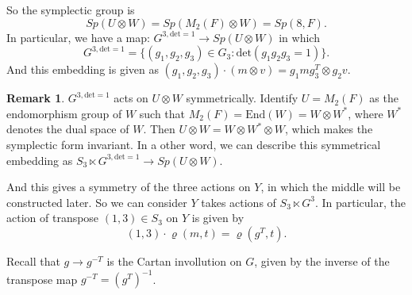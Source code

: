 \documentclass[12pt,a4paper,english]{article}
\theoremstyle{plain}
\theoremstyle{definition}
\newtheorem*{rem}{Remark}
\begin{document}
So the symplectic group is 
\begin{equation*}
    Sp(U\otimes W)=Sp(M_{2}(F)\otimes W)=Sp(8, F).
\end{equation*}
In particular, we have a map:
    $G^{3, \text{det}=1}\rightarrow Sp(U\otimes W)$
in which $$G^{3,\text{det}=1}=\{(g_{1},g_{2},g_{3})\in G_{3}:\text{det}(g_{1}g_{2}g_{3}=1)\}.$$
And this embedding is given as $(g_{1}, g_{2},g_{3})\cdot (m\otimes v)= g_{1}m
    g_{3}^{T}\otimes g_{2}v.$
\begin{rem}
$G^{3, \text{det}=1}$ acts on $U\otimes W$ symmetrically. Identify $U=M_{2}(F)$ as the endomorphism group of $W$ such that $M_{2}(F)=\text{End}(W)=W\otimes W^{*}$, where $W^{*}$ denotes the dual space of $W$. Then $U\otimes W=W\otimes W^{*}\otimes W$, which makes the symplectic form invariant. In a other word, we can describe  this symmetrical embedding as 
$S_{3}\ltimes G^{3, \text{det}=1}\rightarrow Sp(U\otimes W)$.

And this gives a symmetry of the three actions on $Y$, in which the middle will be constructed later. So we can consider $Y$ takes actions of $S_{3}\ltimes G^{3}$. In particular, the action of transpose $(1,3)\in S_{3}$ on $Y$ is given by 
\begin{equation*}
    (1,3)\cdot \varrho(m,t)=\varrho(g^{T},t).
\end{equation*}

Recall that $g\rightarrow g^{-T}$ is the Cartan invollution on $G$, given by the inverse of the transpose  map $g^{-T}=(g^{T})^{-1}$.
\end{rem}
\end{document}
